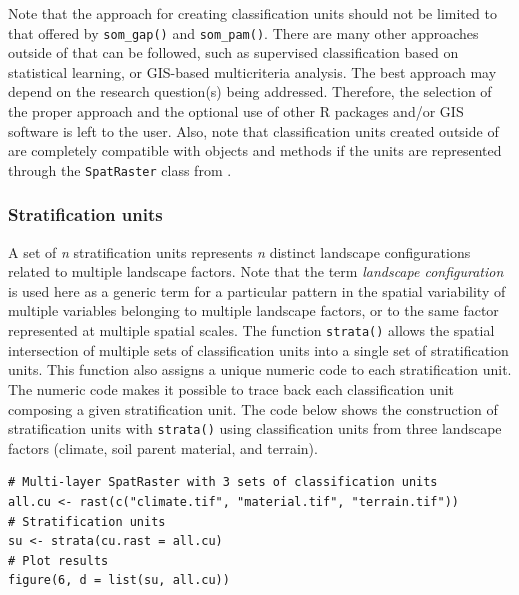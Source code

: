 Note that the approach for creating classification units should not be limited
to that offered by \texttt{som\_gap()} and \texttt{som\_pam()}. There are many other approaches
outside of  that can be followed, such as supervised classification
based on statistical learning, or GIS-based multicriteria analysis. The best
approach may depend on the research question(s) being addressed. Therefore, the
selection of the proper approach and the optional use of other R packages and/or
GIS software is left to the user. Also, note that classification units created
outside of  are completely compatible with  objects and
methods if the units are represented through the \texttt{SpatRaster} class from
.

\hypertarget{stratification-units}{%
\subsubsection{Stratification units}\label{stratification-units}}

A set of \emph{n} stratification units represents \emph{n} distinct landscape
configurations related to multiple landscape factors. Note that the term
\emph{landscape configuration} is used here as a generic term for a particular
pattern in the spatial variability of multiple variables belonging to multiple
landscape factors, or to the same factor represented at multiple spatial scales.
The function \texttt{strata()} allows the spatial intersection of multiple sets of
classification units into a single set of stratification units. This function
also assigns a unique numeric code to each stratification unit. The numeric code
makes it possible to trace back each classification unit composing a given
stratification unit. The code below shows the construction of stratification
units with \texttt{strata()} using classification units from three landscape factors
(climate, soil parent material, and terrain).

\begin{verbatim}
# Multi-layer SpatRaster with 3 sets of classification units
all.cu <- rast(c("climate.tif", "material.tif", "terrain.tif"))
# Stratification units
su <- strata(cu.rast = all.cu)
# Plot results
figure(6, d = list(su, all.cu))
\end{verbatim}

